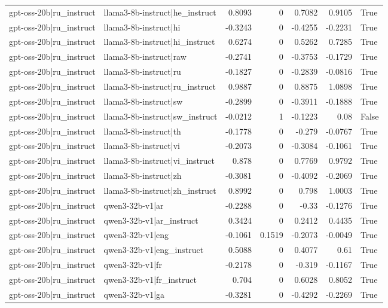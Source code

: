 \begin{table}
\begin{tabular}{l l r r r r l}
gpt-oss-20b|ru_instruct & llama3-8b-instruct|he_instruct & 0.8093 & 0 & 0.7082 & 0.9105 & True \\
gpt-oss-20b|ru_instruct & llama3-8b-instruct|hi & -0.3243 & 0 & -0.4255 & -0.2231 & True \\
gpt-oss-20b|ru_instruct & llama3-8b-instruct|hi_instruct & 0.6274 & 0 & 0.5262 & 0.7285 & True \\
gpt-oss-20b|ru_instruct & llama3-8b-instruct|raw & -0.2741 & 0 & -0.3753 & -0.1729 & True \\
gpt-oss-20b|ru_instruct & llama3-8b-instruct|ru & -0.1827 & 0 & -0.2839 & -0.0816 & True \\
gpt-oss-20b|ru_instruct & llama3-8b-instruct|ru_instruct & 0.9887 & 0 & 0.8875 & 1.0898 & True \\
gpt-oss-20b|ru_instruct & llama3-8b-instruct|sw & -0.2899 & 0 & -0.3911 & -0.1888 & True \\
gpt-oss-20b|ru_instruct & llama3-8b-instruct|sw_instruct & -0.0212 & 1 & -0.1223 & 0.08 & False \\
gpt-oss-20b|ru_instruct & llama3-8b-instruct|th & -0.1778 & 0 & -0.279 & -0.0767 & True \\
gpt-oss-20b|ru_instruct & llama3-8b-instruct|vi & -0.2073 & 0 & -0.3084 & -0.1061 & True \\
gpt-oss-20b|ru_instruct & llama3-8b-instruct|vi_instruct & 0.878 & 0 & 0.7769 & 0.9792 & True \\
gpt-oss-20b|ru_instruct & llama3-8b-instruct|zh & -0.3081 & 0 & -0.4092 & -0.2069 & True \\
gpt-oss-20b|ru_instruct & llama3-8b-instruct|zh_instruct & 0.8992 & 0 & 0.798 & 1.0003 & True \\
gpt-oss-20b|ru_instruct & qwen3-32b-v1|ar & -0.2288 & 0 & -0.33 & -0.1276 & True \\
gpt-oss-20b|ru_instruct & qwen3-32b-v1|ar_instruct & 0.3424 & 0 & 0.2412 & 0.4435 & True \\
gpt-oss-20b|ru_instruct & qwen3-32b-v1|eng & -0.1061 & 0.1519 & -0.2073 & -0.0049 & True \\
gpt-oss-20b|ru_instruct & qwen3-32b-v1|eng_instruct & 0.5088 & 0 & 0.4077 & 0.61 & True \\
gpt-oss-20b|ru_instruct & qwen3-32b-v1|fr & -0.2178 & 0 & -0.319 & -0.1167 & True \\
gpt-oss-20b|ru_instruct & qwen3-32b-v1|fr_instruct & 0.704 & 0 & 0.6028 & 0.8052 & True \\
gpt-oss-20b|ru_instruct & qwen3-32b-v1|ga & -0.3281 & 0 & -0.4292 & -0.2269 & True \\

\end{tabular}
\end{table}
